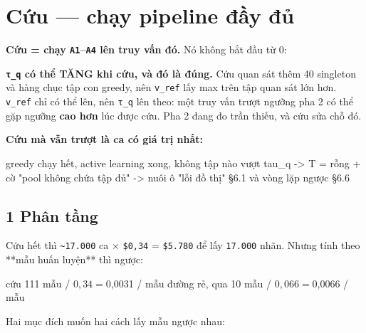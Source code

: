 \documentclass[11pt,a4paper]{article}
\begin{document}
\section{Cứu — chạy pipeline đầy đủ}

\textbf{Cứu = chạy \texttt{A1}–\texttt{A4} lên truy vấn đó.} Nó không bắt đầu từ 0:


\textbf{\texttt{τ\_q} có thể TĂNG khi cứu, và đó là đúng.} Cứu quan sát thêm 40 singleton và hàng chục tập
con greedy, nên \texttt{v\_ref} lấy max trên tập quan sát lớn hơn. \texttt{v\_ref} chỉ có thể lên, nên \texttt{τ\_q}
lên theo: một truy vấn trượt ngưỡng pha 2 có thể gặp ngưỡng \textbf{cao hơn} lúc được cứu. Pha 2
đang đo trần thiếu, và cứu sửa chỗ đó.

\textbf{Cứu mà vẫn trượt là ca có giá trị nhất:}

\begin{dia}
greedy chạy hết, active learning xong, không tập nào vượt tau_q
->  T = rỗng  +  cờ "pool không chứa tập đủ"
->  nuôi ô "lỗi đồ thị" §6.1 và vòng lặp ngược §6.6
\end{dia}

\subsection{1 Phân tầng}

Cứu hết thì \texttt{\textasciitilde{}17.000} ca × \texttt{\$0,34} = \texttt{\$5.780} để lấy \texttt{17.000} nhãn. Nhưng tính theo **mẫu huấn
luyện** thì ngược:

\begin{dia}
cứu              111 mẫu / $0,34    =   $0,0031 / mẫu
đường rẻ, qua     10 mẫu / $0,066   =   $0,0066 / mẫu
\end{dia}

Hai mục đích muốn hai cách lấy mẫu ngược nhau:
\end{document}
